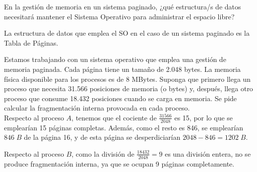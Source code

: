 \begin{ejercicio}\label{ej:2.Ejercicio20}
    En la gestión de memoria en un sistema paginado, ¿qué estructura/s de datos necesitará mantener el Sistema Operativo para administrar el espacio libre?

    La estructura de datos que emplea el SO en el caso de un sistema paginado es la Tabla de Páginas.
\end{ejercicio}

\begin{ejercicio}\label{ej:2.Ejercicio21}
    Estamos trabajando con un sistema operativo que emplea una gestión de memoria paginada. Cada página tiene un tamaño de 2.048 bytes. La memoria física disponible para los procesos es de 8 MBytes. Suponga que primero llega un proceso que necesita 31.566 posiciones de memoria (o bytes) y, después, llega otro proceso que consume 18.432 posiciones cuando se carga en memoria. Se pide calcular la fragmentación interna provocada en cada proceso.\\

    Respecto al proceso $A$, tenemos que el cociente de $\frac{31566}{2048}$ es 15, por lo que se emplearían 15 páginas completas. Además, como el resto es 846, se emplearían $846\;B$ de la página 16, y de esta página se desperdiciarían $2048-846=1202\;B$.

    Respecto al proceso $B$, como la división de $\frac{18432}{2048}=9$ es una división entera, no se produce fragmentación interna, ya que se ocupan 9 páginas completamente.
\end{ejercicio}

